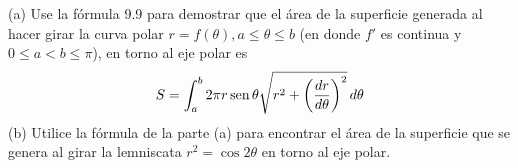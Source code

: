 \item (a) Use la fórmula 9.9 para demostrar que el área de la superficie generada al hacer girar la curva polar $r = f(\theta), a \le \theta \le b$ (en donde $f'$ es continua y $0 \le a < b \le \pi$), en torno al eje polar es 
    \[ S = \int_a^b 2\pi r \operatorname{sen}\theta \sqrt{r^2 + \left(\frac{dr}{d\theta}\right)^2} \, d\theta \]
    (b) Utilice la fórmula de la parte (a) para encontrar el área de la superficie que se genera al girar la lemniscata $r^2 = \cos 2\theta$ en torno al eje polar.

